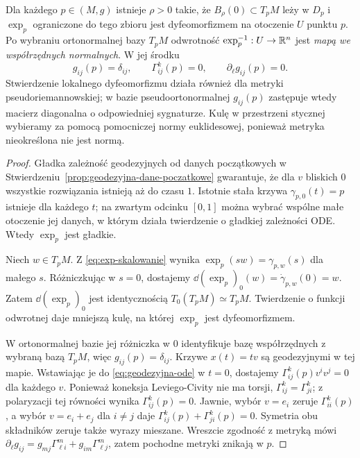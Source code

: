 \begin{twierdzenie}
\label{thm:wspolrzedne-normalne}
Dla każdego $p\in(M,g)$ istnieje $\rho>0$
takie, że $B_\rho(0)\subset T_pM$ leży w $D_p$
i $\exp_p$ ograniczone do tego zbioru jest
dyfeomorfizmem na otoczenie $U$ punktu $p$.
Po wybraniu ortonormalnej bazy $T_pM$
odwrotność $\exp_p^{-1}:U\to\mathbb{R}^n$ jest
\emph{mapą we współrzędnych normalnych}.
W jej środku
\begin{equation}\label{eq:normalne-metryka}
 g_{ij}(p)=\delta_{ij},\qquad
 \Gamma^k_{ij}(p)=0,\qquad
 \partial_\ell g_{ij}(p)=0.
\end{equation}
Stwierdzenie lokalnego dyfeomorfizmu działa
również dla metryki pseudoriemannowskiej;
w bazie pseudoortonormalnej $g_{ij}(p)$ zastępuje wtedy
macierz diagonalna o odpowiedniej sygnaturze. Kulę
w przestrzeni stycznej wybieramy za pomocą pomocniczej
normy euklidesowej, ponieważ metryka nieokreślona nie jest normą.
\end{twierdzenie}
\begin{proof}
Gładka zależność geodezyjnych od danych
początkowych w Stwierdzeniu~\ref{prop:geodezyjna-dane-poczatkowe}
gwarantuje, że dla $v$ bliskich $0$ wszystkie
rozwiązania istnieją aż do czasu $1$.
Istotnie stała krzywa $\gamma_{p,0}(t)=p$
istnieje dla każdego $t$; na zwartym odcinku
$[0,1]$ można wybrać wspólne małe otoczenie
jej danych, w którym działa twierdzenie o gładkiej
zależności ODE. Wtedy $\exp_p$ jest gładkie.

Niech $w\in T_pM$. Z \eqref{eq:exp-skalowanie}
wynika $\exp_p(sw)=\gamma_{p,w}(s)$ dla małego $s$.
Różniczkując w $s=0$, dostajemy
$\dd(\exp_p)_0(w)=\dot\gamma_{p,w}(0)=w$.
Zatem $\dd(\exp_p)_0$ jest identycznością
$T_0(T_pM)\simeq T_pM$. Twierdzenie o funkcji
odwrotnej daje mniejszą kulę, na której
$\exp_p$ jest dyfeomorfizmem.

W ortonormalnej bazie jej różniczka w $0$
identyfikuje bazę współrzędnych z wybraną bazą
$T_pM$, więc $g_{ij}(p)=\delta_{ij}$.
Krzywe $x(t)=tv$ są geodezyjnymi w tej mapie.
Wstawiając je do \eqref{eq:geodezyjna-ode}
w $t=0$, dostajemy
$\Gamma^k_{ij}(p)v^iv^j=0$ dla każdego $v$.
Ponieważ koneksja Leviego-Civity nie ma torsji,
$\Gamma^k_{ij}=\Gamma^k_{ji}$; z polaryzacji
tej równości wynika $\Gamma^k_{ij}(p)=0$.
Jawnie, wybór $v=e_i$ zeruje $\Gamma^k_{ii}(p)$,
a wybór $v=e_i+e_j$ dla $i\ne j$ daje
$\Gamma^k_{ij}(p)+\Gamma^k_{ji}(p)=0$.
Symetria obu składników zeruje także wyrazy mieszane.
Wreszcie zgodność z metryką mówi
$\partial_\ell g_{ij}
=g_{mj}\Gamma^m_{\ell i}
 +g_{im}\Gamma^m_{\ell j}$, zatem pochodne
metryki znikają w $p$.
\end{proof}

